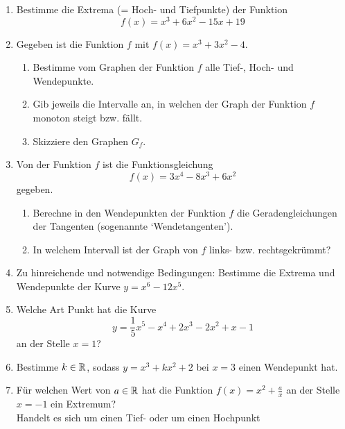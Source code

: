 \begin{ueb}
    {}{}
    \begin{enumerate}
        \item Bestimme die Extrema (= Hoch- und Tiefpunkte) der Funktion  $$ f(x) = x^3 + 6x^2 - 15x + 19$$
        \item  Gegeben ist die Funktion \( f \) mit \( f(x) = x^3 + 3x^2 - 4 \).
        \begin{enumerate}
            \item Bestimme vom Graphen der Funktion \( f \) alle Tief-, Hoch- und Wendepunkte.
            \item Gib jeweils die Intervalle an, in welchen der Graph der Funktion \( f \) monoton steigt bzw. fällt.
            \item Skizziere den Graphen \( G_f \).
        \end{enumerate}
          \item Von der Funktion \( f \) ist die Funktionsgleichung 
                \[
               f(x) = 3x^4 - 8x^3 + 6x^2
                \]
                gegeben.
                \begin{enumerate}
                    \item Berechne in den Wendepunkten der Funktion \( f \) die Geradengleichungen der Tangenten (sogenannte `Wendetangenten').
                    \item In welchem Intervall ist der Graph von \( f \) links- bzw. rechtsgekrümmt?
                \end{enumerate}
        \item Zu hinreichende und notwendige Bedingungen: Bestimme die Extrema und Wendepunkte der Kurve $y=x^6-12x^5$.
        
        \item Welche Art Punkt hat die Kurve
        $$ y= \frac{1}{5} x^5 - x^4 + 2x^3 -2 x^2 + x - 1$$
        an der Stelle $x=1$?
        \item Bestimme $k\in \mathbb{R}$, sodass $y=x^3+kx^2+2$ bei $x= 3$ einen Wendepunkt hat.
        \item Für welchen Wert von $a\in\mathbb{R}$ hat die Funktion $f(x) = x^2 + \frac{a}{x}$ an der Stelle $x=-1$ ein Extremum? \\
        Handelt es sich um einen Tief- oder um einen Hochpunkt
    \end{enumerate}
\end{ueb}

